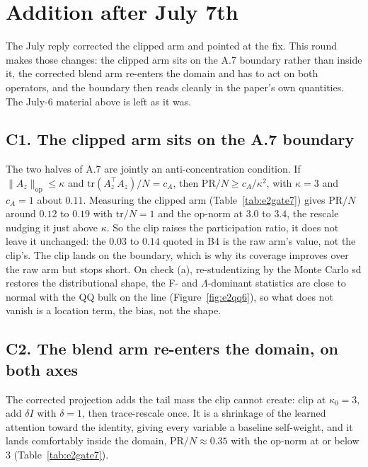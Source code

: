 \documentclass[11pt]{article}
\begin{document}
\clearpage
\section*{Addition after July 7th}
The July reply corrected the clipped arm and pointed at the fix. This round makes those changes:
the clipped arm sits on the A.7 boundary rather than inside it, the corrected blend arm re-enters
the domain and has to act on both operators, and the boundary then reads cleanly in the paper's own
quantities. The July-6 material above is left as it was.

\subsection*{C1. The clipped arm sits on the A.7 boundary}
The two halves of A.7 are jointly an anti-concentration condition. If $\|A_z\|_{\mathrm{op}}\le\kappa$
and $\mathrm{tr}(A_z^\top A_z)/N=c_A$, then $\mathrm{PR}/N\ge c_A/\kappa^2$, with $\kappa=3$ and
$c_A=1$ about $0.11$. Measuring the clipped arm (Table~\ref{tab:e2gate7}) gives $\mathrm{PR}/N$ around
$0.12$ to $0.19$ with $\mathrm{tr}/N=1$ and the op-norm at $3.0$ to $3.4$, the rescale nudging it just
above $\kappa$. So the clip raises the participation ratio, it does not leave it unchanged: the
$0.03$ to $0.14$ quoted in B4 is the raw arm's value, not the clip's. The clip lands on the boundary,
which is why its coverage improves over the raw arm but stops short. On check (a), re-studentizing by
the Monte Carlo sd restores the distributional shape, the F- and $\Lambda$-dominant statistics are
close to normal with the QQ bulk on the line (Figure~\ref{fig:e2qq6}), so what does not vanish is a
location term, the bias, not the shape.

\subsection*{C2. The blend arm re-enters the domain, on both axes}
The corrected projection adds the tail mass the clip cannot create: clip at $\kappa_0=3$, add
$\delta I$ with $\delta=1$, then trace-rescale once. It is a shrinkage of the learned attention toward
the identity, giving every variable a baseline self-weight, and it lands comfortably inside the
domain, $\mathrm{PR}/N\approx0.35$ with the op-norm at or below $3$ (Table~\ref{tab:e2gate7}).
\end{document}
